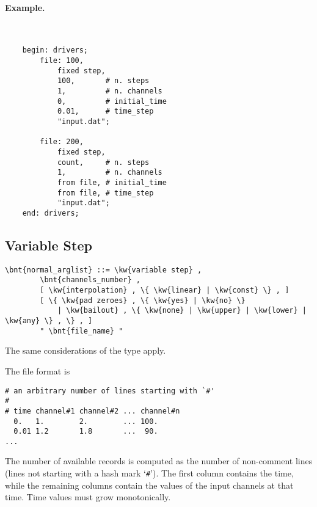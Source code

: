 \paragraph{Example.} \
\begin{verbatim}
    begin: drivers;
        file: 100,
            fixed step,
            100,       # n. steps
            1,         # n. channels
            0,         # initial_time
            0.01,      # time_step
            "input.dat";

        file: 200,
            fixed step,
            count,     # n. steps
            1,         # n. channels
            from file, # initial_time
            from file, # time_step
            "input.dat";
    end: drivers;
\end{verbatim}

\subsection{Variable Step}
\begin{Verbatim}[commandchars=\\\{\}]
    \bnt{normal_arglist} ::= \kw{variable step} , 
        \bnt{channels_number} ,
        [ \kw{interpolation} , \{ \kw{linear} | \kw{const} \} , ]
        [ \{ \kw{pad zeroes} , \{ \kw{yes} | \kw{no} \} 
            | \kw{bailout} , \{ \kw{none} | \kw{upper} | \kw{lower} | \kw{any} \} , \} , ]
        " \bnt{file_name} "
\end{Verbatim}
The same considerations of the  type apply.

The file format is
\begin{verbatim}
# an arbitrary number of lines starting with `#'
#
# time channel#1 channel#2 ... channel#n
  0.   1.        2.        ... 100.
  0.01 1.2       1.8       ...  90.
...
\end{verbatim}
The number of available records is computed as the number
of non-comment lines (lines not starting with a hash mark `\texttt{\#}').
The first column contains the time, while the remaining
 columns contain the values of the input channels
at that time.
Time values must grow monotonically.


